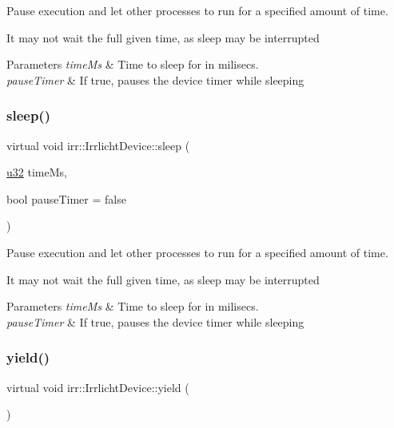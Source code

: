 Pause execution and let other processes to run for a specified amount of time. 

It may not wait the full given time, as sleep may be interrupted 
\begin{DoxyParams}{Parameters}
{\em time\+Ms} & Time to sleep for in milisecs. \\
\hline
{\em pause\+Timer} & If true, pauses the device timer while sleeping \\
\hline
\end{DoxyParams}
\mbox{\label{classirr_1_1IrrlichtDevice_a89a3ecebc0e7c5ae08617b78a6e8a9f7}} 
\subsubsection{\texorpdfstring{sleep()}{sleep()}\hspace{0.1cm}{\footnotesize\ttfamily [3/3]}}
{\footnotesize\ttfamily virtual void irr\+::\+Irrlicht\+Device\+::sleep (\begin{DoxyParamCaption}\item[{\hyperlink{namespaceirr_a0416a53257075833e7002efd0a18e804}{u32}}]{time\+Ms,  }\item[{bool}]{pause\+Timer = {\ttfamily false} }\end{DoxyParamCaption})\hspace{0.3cm}{\ttfamily [pure virtual]}}



Pause execution and let other processes to run for a specified amount of time. 

It may not wait the full given time, as sleep may be interrupted 
\begin{DoxyParams}{Parameters}
{\em time\+Ms} & Time to sleep for in milisecs. \\
\hline
{\em pause\+Timer} & If true, pauses the device timer while sleeping \\
\hline
\end{DoxyParams}
\mbox{\label{classirr_1_1IrrlichtDevice_a731727774fad9fc4c6c1c85277ca36dc}} 
\subsubsection{\texorpdfstring{yield()}{yield()}\hspace{0.1cm}{\footnotesize\ttfamily [1/3]}}
{\footnotesize\ttfamily virtual void irr\+::\+Irrlicht\+Device\+::yield (\begin{DoxyParamCaption}{ }\end{DoxyParamCaption})\hspace{0.3cm}{\ttfamily [pure virtual]}}




